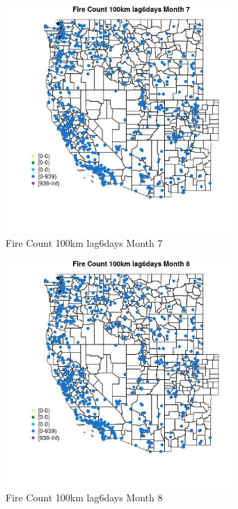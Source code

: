 \begin{figure} 
\centering  
\includegraphics[width=0.77\textwidth]{Code_Outputs/Report_ML_input_PM25_Step4_part_e_de_duplicated_aves_compiled_2019-05-21wNAs_MapObsMo7Fire_Count_100km_lag6days.jpg} 
\caption{\label{fig:Report_ML_input_PM25_Step4_part_e_de_duplicated_aves_compiled_2019-05-21wNAsMapObsMo7Fire_Count_100km_lag6days}Fire Count 100km lag6days Month 7} 
\end{figure} 
 

\begin{figure} 
\centering  
\includegraphics[width=0.77\textwidth]{Code_Outputs/Report_ML_input_PM25_Step4_part_e_de_duplicated_aves_compiled_2019-05-21wNAs_MapObsMo8Fire_Count_100km_lag6days.jpg} 
\caption{\label{fig:Report_ML_input_PM25_Step4_part_e_de_duplicated_aves_compiled_2019-05-21wNAsMapObsMo8Fire_Count_100km_lag6days}Fire Count 100km lag6days Month 8} 
\end{figure} 
 

